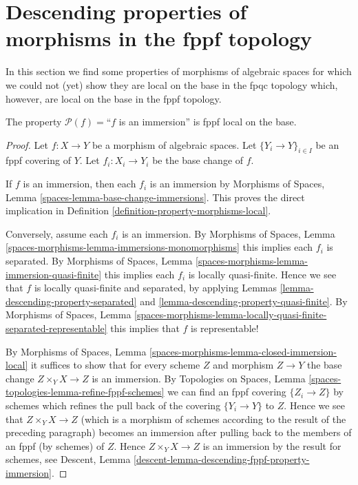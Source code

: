 \section{Descending properties of morphisms in the fppf topology}
\label{section-descending-properties-morphisms-fppf}

\noindent
In this section we find some properties of morphisms of algebraic spaces
for which we could not (yet) show they are local on the base in
the fpqc topology which, however, are local on the base
in the fppf topology.

\begin{lemma}
\label{lemma-descending-fppf-property-immersion}
The property $\mathcal{P}(f) =$``$f$ is an immersion''
is fppf local on the base.
\end{lemma}

\begin{proof}
Let $f : X \to Y$ be a morphism of algebraic spaces.
Let $\{Y_i \to Y\}_{i \in I}$ be an fppf covering of $Y$.
Let $f_i : X_i \to Y_i$ be the base change of $f$.

\medskip\noindent
If $f$ is an immersion, then each $f_i$ is an immersion by
Morphisms of Spaces,
Lemma \ref{spaces-lemma-base-change-immersions}.
This proves the direct implication in
Definition \ref{definition-property-morphisms-local}.

\medskip\noindent
Conversely, assume each $f_i$ is an immersion. By
Morphisms of Spaces,
Lemma \ref{spaces-morphisms-lemma-immersions-monomorphisms}
this implies each $f_i$ is separated. By
Morphisms of Spaces,
Lemma \ref{spaces-morphisms-lemma-immersion-quasi-finite}
this implies each $f_i$ is locally quasi-finite.
Hence we see that $f$ is locally quasi-finite and separated, by applying
Lemmas \ref{lemma-descending-property-separated}
and \ref{lemma-descending-property-quasi-finite}.
By
Morphisms of Spaces, Lemma
\ref{spaces-morphisms-lemma-locally-quasi-finite-separated-representable}
this implies that $f$ is representable!

\medskip\noindent
By
Morphisms of Spaces, Lemma \ref{spaces-morphisms-lemma-closed-immersion-local}
it suffices to show that for every scheme $Z$ and morphism $Z \to Y$
the base change $Z \times_Y X \to Z$ is an immersion. By
Topologies on Spaces, Lemma \ref{spaces-topologies-lemma-refine-fppf-schemes}
we can find an fppf covering $\{Z_i \to Z\}$ by schemes which refines
the pull back of the covering $\{Y_i \to Y\}$ to $Z$.
Hence we see that $Z \times_Y X \to Z$ (which is a morphism of schemes
according to the result of the preceding paragraph) becomes an immersion
after pulling back to the members of an fppf (by schemes) of $Z$.
Hence $Z \times_Y X \to Z$ is an immersion by the result for schemes, see
Descent, Lemma \ref{descent-lemma-descending-fppf-property-immersion}.
\end{proof}

